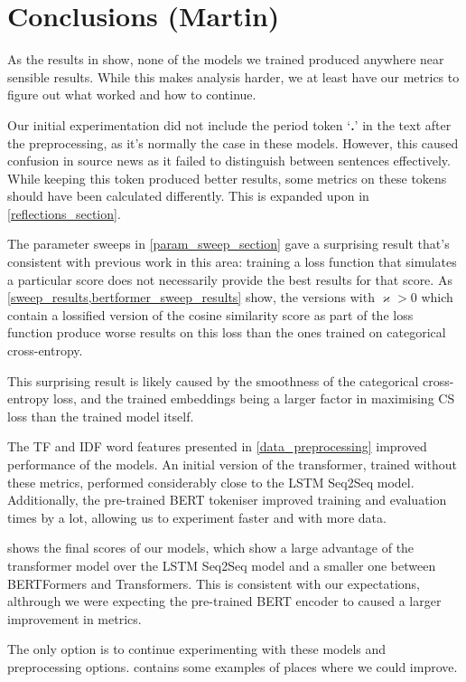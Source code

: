 \section{Conclusions (Martin)}

As the results in \appendixA{} show, none of the models we trained produced anywhere near sensible results.
While this makes analysis harder, we at least have our metrics to figure out what worked and how to continue.

Our initial experimentation did not include the period token `\textbf{.}' in the text after the preprocessing, as it's normally the case in these models.
However, this caused confusion in source news as it failed to distinguish between sentences effectively.
While keeping this token produced better results, some metrics on these tokens should have been calculated differently.
This is expanded upon in \cref{reflections_section}.

The parameter sweeps in \cref{param_sweep_section} gave a surprising result that's consistent with previous work in this area: training a loss function that simulates a particular score does not necessarily provide the best results for that score.
As \cref{sweep_results,bertformer_sweep_results} show, the versions with $\varkappa > 0$ which contain a lossified version of the cosine similarity score as part of the loss function produce worse results on this loss than the ones trained on categorical cross-entropy.

This surprising result is likely caused by the smoothness of the categorical cross-entropy loss, and the trained embeddings being a larger factor in maximising CS loss than the trained model itself.

The TF and IDF word features presented in \cref{data_preprocessing} improved performance of the models.
An initial version of the transformer, trained without these metrics, performed considerably close to the LSTM Seq2Seq model.
Additionally, the pre-trained BERT tokeniser improved training and evaluation times by a lot, allowing us to experiment faster and with more data.

 shows the final scores of our models, which show a large advantage of the transformer model over the LSTM Seq2Seq model and a smaller one between BERTFormers and Transformers.
This is consistent with our expectations, althrough we were expecting the pre-trained BERT encoder to caused a larger improvement in metrics.

The only option is to continue experimenting with these models and preprocessing options.
 contains some examples of places where we could improve.
